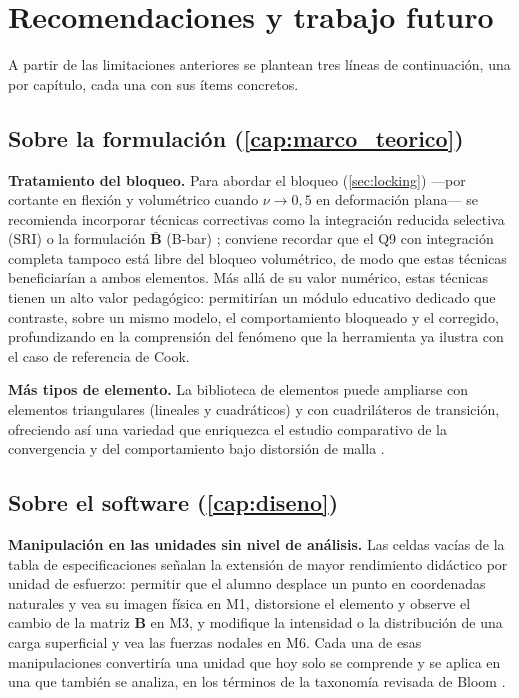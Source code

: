\section*{Recomendaciones y trabajo futuro}

A partir de las limitaciones anteriores se plantean tres líneas de continuación, una por capítulo, cada una con sus ítems concretos.

\subsection*{Sobre la formulación (\autoref{cap:marco_teorico})}

\textbf{Tratamiento del bloqueo.} Para abordar el bloqueo (\autoref{sec:locking}) —por cortante en flexión y volumétrico cuando $\nu \to 0{,}5$ en deformación plana— se recomienda incorporar técnicas correctivas como la integración reducida selectiva (SRI) o la formulación $\bar{\bm{B}}$ (B-bar) \autocite{hughes2000fem,bathe2014fem}; conviene recordar que el Q9 con integración completa tampoco está libre del bloqueo volumétrico, de modo que estas técnicas beneficiarían a ambos elementos. Más allá de su valor numérico, estas técnicas tienen un alto valor pedagógico: permitirían un módulo educativo dedicado que contraste, sobre un mismo modelo, el comportamiento bloqueado y el corregido, profundizando en la comprensión del fenómeno que la herramienta ya ilustra con el caso de referencia de Cook.

\textbf{Más tipos de elemento.} La biblioteca de elementos puede ampliarse con elementos triangulares (lineales y cuadráticos) y con cuadriláteros de transición, ofreciendo así una variedad que enriquezca el estudio comparativo de la convergencia y del comportamiento bajo distorsión de malla \autocite{onate2009structural,reddy2006introduction}.

\subsection*{Sobre el software (\autoref{cap:diseno})}

\textbf{Manipulación en las unidades sin nivel de análisis.} Las celdas vacías de la tabla de especificaciones señalan la extensión de mayor rendimiento didáctico por unidad de esfuerzo: permitir que el alumno desplace un punto en coordenadas naturales y vea su imagen física en M1, distorsione el elemento y observe el cambio de la matriz $\bm{B}$ en M3, y modifique la intensidad o la distribución de una carga superficial y vea las fuerzas nodales en M6. Cada una de esas manipulaciones convertiría una unidad que hoy solo se comprende y se aplica en una que también se analiza, en los términos de la taxonomía revisada de Bloom \autocite{anderson2001taxonomy}.

